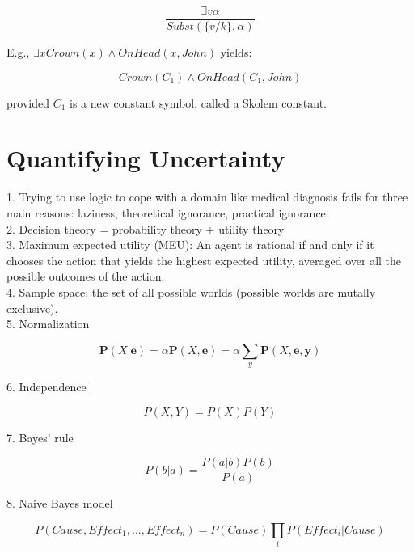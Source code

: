 \documentclass[12pt]{article}
\begin{document}
\begin{equation*}
  \frac {\exists v \alpha}{Subst(\{v/k\}, \alpha)}
\end{equation*}

E.g., $\exists x Crown(x) \land OnHead(x, John)$ yields:

\begin{equation*}
  Crown(C_1) \land OnHead(C_1, John)
\end{equation*}

provided $C_1$ is a new constant symbol, called a Skolem constant.

\section{Quantifying Uncertainty}

1. Trying to use logic to cope with a domain like medical diagnosis fails for three main reasons: laziness, theoretical ignorance, practical ignorance. \\

2. Decision theory = probability theory + utility theory \\

3. Maximum expected utility (MEU): An agent is rational if and only if it chooses the action that yields the highest expected utility, averaged over all the possible outcomes of the action. \\

4. Sample space: the set of all possible worlds (possible worlds are mutally exclusive). \\

5. Normalization

\begin{equation*}
\boldsymbol{P}(X|\boldsymbol{e}) =
\alpha \boldsymbol{P}(X, \boldsymbol{e}) = \alpha \sum_y \boldsymbol{P}(X, \boldsymbol{e}, \boldsymbol{y})
\end{equation*}

6. Independence

\begin{equation*}
P(X,Y) = P(X)P(Y)
\end{equation*}

7. Bayes' rule

\begin{equation*}
P(b|a) = \frac {P(a|b)P(b)}{P(a)}
\end{equation*}

8. Naive Bayes model

\begin{equation*}
P(Cause, Effect_1,..., Effect_n) =
P(Cause) \prod_iP(Effect_i|Cause)
\end{equation*}
\end{document}
